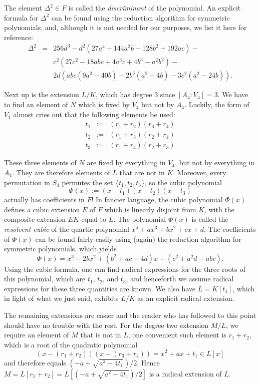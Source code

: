 \documentclass[12pt]{article}
\begin{document}
The element $\Delta^2 \in F$ is called the {\em discriminant} of the polynomial. An explicit formula for $\Delta^2$ can be found using the reduction algorithm for symmetric polynomials, and, although it is not needed for our purposes, we list it here for reference:
\begin{eqnarray*}
\Delta^2 & = & 256 d^3 - d^2 (27 a^4 - 144 a^2 b + 128 b^2 + 192 a c) - \\
& & c^2 (27c^2 - 18 abc + 4a^3 c + 4 b^3 - a^2 b^2) - \\
& & 2d (abc (9a^2 - 40 b) - 2b^3 (a^2-4b) - 3c^2 (a^2-24b)).
\end{eqnarray*}

Next up is the extension $L/K$, which has degree 3 since
$[A_4:V_4]=3$. We have to find an element of $N$ which is fixed by
$V_4$ but not by $A_4$. Luckily, the form of $V_4$ almost cries out
that the following elements be used:
\begin{eqnarray*}
t_1 & := & (r_1+r_2)(r_3+r_4) \\
t_2 & := & (r_1+r_3)(r_2+r_4) \\
t_3 & := & (r_1+r_4)(r_2+r_3)
\end{eqnarray*}

These three elements of $N$ are fixed by everything in $V_4$, but not
by everything in $A_4$. They are therefore elements of $L$ that are
not in $K$. Moreover, every permutation in $S_4$ permutes the set
$\{t_1, t_2, t_3\}$, so the cubic polynomial
$$
\Phi(x) := (x-t_1) (x-t_2) (x-t_3)
$$
actually has coefficients in $F$!  In fancier language, the cubic
polynomial $\Phi(x)$ defines a cubic extension $E$ of $F$ which is
linearly disjoint from $K$, with the composite extension $EK$ equal to
$L$. The polynomial $\Phi(x)$ is called the {\em resolvent cubic} of
the quartic polynomial $x^4 + ax^3 + bx^2 + cx + d$. The coefficients
of $\Phi(x)$ can be found fairly easily using (again) the reduction
algorithm for symmetric polynomials, which yields
\begin{equation}\label{resolvent}
\Phi(x) = x^3 - 2b x^2 + (b^2+ac-4d) x + (c^2+a^2d - abc).
\end{equation}
Using the cubic formula, one can find radical expressions for the
three roots of this polynomial, which are $t_1$, $t_2$, and $t_3$, and
henceforth we assume radical expressions for these three quantities
are known. We also have $L = K[t_1]$, which in light of what we just
said, exhibits $L/K$ as an explicit radical extension.

The remaining extensions are easier and the reader who has followed to
this point should have no trouble with the rest. For the degree two
extension $M/L$, we require an element of $M$ that is not in $L$; one
convenient such element is $r_1+r_2$, which is a root of the quadratic
polynomial
\begin{equation}\label{step}
(x-(r_1+r_2)) (x-(r_3+r_4)) = x^2 + a x + t_1 \in L[x]
\end{equation}
and therefore equals $(-a + \sqrt{a^2 - 4 t_1})/2$. Hence $M =
L[r_1+r_2] = L[(-a + \sqrt{a^2 - 4 t_1})/2]$ is a radical extension of
$L$.
\end{document}
